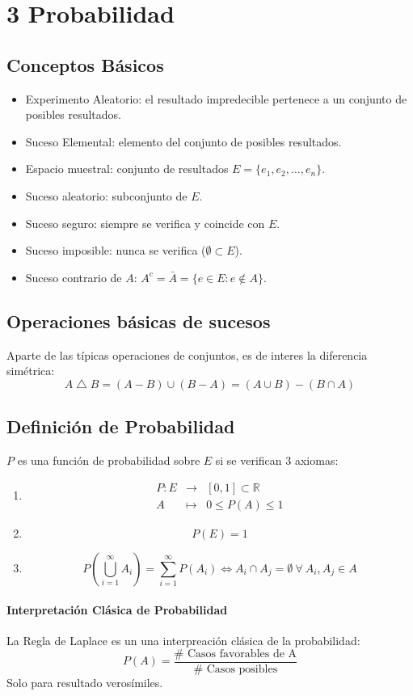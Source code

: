 \documentclass[10pt,a4paper]{book}
\newcommand{\cchap}[2]{
	\setcounter{chapter}{#1}
	\chapter*{\color{blue}\textbf{#1} \color{black} #2}
	\setcounter{section}{0}
}
\begin{document}
\cchap{3}{Probabilidad}
\section{Conceptos Básicos}
\begin{itemize}
\item Experimento Aleatorio: el resultado impredecible pertenece a un conjunto de posibles resultados.
\item Suceso Elemental: elemento del conjunto de posibles resultados.
\item Espacio muestral: conjunto de resultados $E = \{e_1,e_2,\dots,e_n\}$.
\item Suceso aleatorio: subconjunto de $E$.
\item Suceso seguro: siempre se verifica y coincide con $E$.
\item Suceso imposible: nunca se verifica ($\emptyset\subset E$).
\item Suceso contrario de $A$: $A^c = \bar{A} = \{e\in E : e\notin A\}$.
\end{itemize}

\section{Operaciones básicas de sucesos}
Aparte de las típicas operaciones de conjuntos, es de interes la diferencia simétrica:
\[A\bigtriangleup B = (A-B)\cup(B-A)=(A\cup B)-(B\cap A)\]

\section{Definición de Probabilidad}
$P$ es una función de probabilidad sobre $E$ si se verifican 3 axiomas:
\begin{enumerate}
\item \[
\begin{array}{rcl}
	P : E&\longrightarrow&[0,1]\subset\mathbb{R}\\
	A&\longmapsto&0\leq P(A) \leq 1
\end{array}\]
\item \[P(E) = 1\]
\item \[P\left(\bigcup_{i=1}^\infty A_i\right) = \sum_{i=1}^\infty P(A_i)\iff A_i\cap A_j =\emptyset\:\forall\:A_i,A_j\in A\]
\end{enumerate}

\subsubsection{Interpretación Clásica de Probabilidad}
La Regla de Laplace es un una interpreación clásica de la probabilidad:
\[P(A) = \frac{\#\text{ Casos favorables de A}}{\#\text{ Casos posibles}}\]
Solo para resultado verosímiles.
\end{document}
